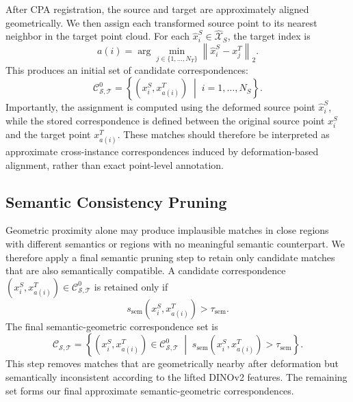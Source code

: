 After CPA registration, the source and target are approximately aligned geometrically.
We then assign each transformed source point to its nearest neighbor in the target point cloud.
For each \(\hat{x}_i^S \in \widehat{\mathcal{X}}_S\), the target index is
\begin{equation}
\label{eq:nearest_neighbor_assignment}
a(i)
=
\arg\min_{j\in\{1,\ldots,N_T\}}
\left\|
\hat{x}_i^S-x_j^T
\right\|_2 .
\end{equation}
This produces an initial set of candidate correspondences:
\begin{equation}
\label{eq:initial_correspondences}
\mathcal{C}_{\mathcal{S},\mathcal{T}}^{0}
=
\left\{
\left(x_i^S,x_{a(i)}^T\right)
\; \middle| \;
i=1,\ldots,N_S
\right\}.
\end{equation}
Importantly, the assignment is computed using the deformed source point \(\hat{x}_i^S\), while the stored correspondence is defined between the original source point \(x_i^S\) and the target point \(x_{a(i)}^T\).
These matches should therefore be interpreted as approximate cross-instance correspondences induced by deformation-based alignment, rather than exact point-level annotation.

\subsection{Semantic Consistency Pruning}
\label{sec:semantic_pruning}

Geometric proximity alone may produce implausible matches in close regions with different semantics or regions with no meaningful semantic counterpart.
We therefore apply a final semantic pruning step to retain only candidate matches that are also semantically compatible.
A candidate correspondence \((x_i^S,x_{a(i)}^T)\in\mathcal{C}_{\mathcal{S},\mathcal{T}}^{0}\) is retained only if
\begin{equation}
\label{eq:semantic_pruning_condition}
s_{\mathrm{sem}}
\left(
x_i^S,
x_{a(i)}^T
\right)
>
\tau_{\mathrm{sem}}.
\end{equation}
The final semantic-geometric correspondence set is
\begin{equation}
\label{eq:final_correspondences}
\mathcal{C}_{\mathcal{S},\mathcal{T}}
=
\left\{
\left(x_i^S,x_{a(i)}^T\right)
\in
\mathcal{C}_{\mathcal{S},\mathcal{T}}^{0}
\; \middle| \;
s_{\mathrm{sem}}
\left(
x_i^S,x_{a(i)}^T
\right)
>
\tau_{\mathrm{sem}}
\right\}.
\end{equation}
This step removes matches that are geometrically nearby after deformation but semantically inconsistent according to the lifted DINOv2 \cite{oquab2024dinov2} features.
The remaining set forms our final approximate semantic-geometric correspondences.

